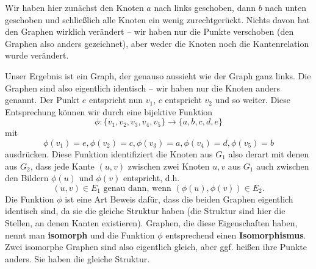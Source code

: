 \documentclass[../../main.tex]{subfiles}
\begin{document}
\begin{center}
    \begin{multicols}{3}
    \end{multicols}
\end{center}
Wir haben hier zunächst den Knoten $a$ nach links geschoben, dann $b$ nach unten geschoben und schließlich alle Knoten 
ein wenig zurechtgerückt. Nichts davon hat den Graphen wirklich verändert -- wir haben nur die Punkte verschoben 
(den Graphen also anders gezeichnet), aber weder die Knoten noch die Kantenrelation wurde verändert. 

Unser Ergebnis ist ein Graph, der genauso aussieht wie der Graph ganz links. 
Die Graphen sind also eigentlich identisch -- wir haben nur die Knoten anders genannt. Der Punkt $e$ entspricht nun 
$v_1$, $c$ entspricht $v_2$ und so weiter. Diese Entsprechung können wir durch eine bijektive Funktion
\[\phi\colon\{v_1,v_2,v_3,v_4,v_5\}\rightarrow\{a,b,c,d,e\}\]
mit
\[\phi(v_1)=e,\phi(v_2)=c,\phi(v_3)=a,\phi(v_4)=d,\phi(v_5)=b\]
ausdrücken. Diese Funktion identifiziert die Knoten aus $G_1$ also derart mit denen aus $G_2$, dass jede Kante $(u,v)$ 
zwischen zwei Knoten $u,v$ aus $G_1$ auch zwischen den Bildern $\phi(u)$ und $\phi(v)$ entspricht, d.h.
\[(u,v)\in E_1\text{ genau dann, wenn }(\phi(u),\phi(v))\in E_2.\]
Die Funktion $\phi$ ist eine Art Beweis dafür, dass die beiden Graphen eigentlich identisch sind, da sie die gleiche 
Struktur haben (die Struktur sind hier die Stellen, an denen Kanten existieren). Graphen, die diese Eigenschaften haben,
nennt man \textbf{isomorph} und die Funktion $\phi$ entsprechend einen \textbf{Isomorphismus}. Zwei isomorphe Graphen
sind also eigentlich gleich, aber ggf. heißen ihre Punkte anders. Sie haben die gleiche Struktur.
\end{document}
